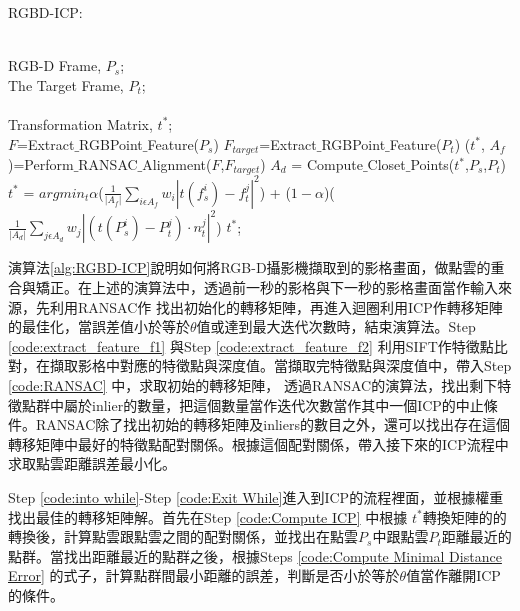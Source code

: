 \begin{algorithm}[htb] 
\renewcommand{\algorithmicrequire}{\textbf{Input:}}
\renewcommand\algorithmicensure {\textbf{Output:} }
\caption{ RGBD-ICP: } %
	\label{alg:RGBD-ICP} %
	\begin{algorithmic}[1] %
	\REQUIRE ~~\\ %
	RGB-D Frame, $P_s$;\\
	The Target Frame, $P_t$;\\
	\ENSURE ~~\\ %
	Transformation Matrix, $t^*$;\\

	\STATE $F$=Extract$\_$RGBPoint$\_$Feature($P_s$) \label{code:extract_feature_f1} 
	\STATE $F_{target}$=Extract$\_$RGBPoint$\_$Feature($P_t$) \label{code:extract_feature_f2}
	\STATE ($t^*$, $A_f$)=Perform$\_$RANSAC$\_$Alignment($F$,$F_{target}$) \label{code:RANSAC}
	\REPEAT \label{code:into while}
		\STATE $A_d$ = Compute$\_$Closet$\_$Points($t^*$,$P_s$,$P_t$) \label{code:Compute ICP}
		\STATE $t^*$ = $argmin_t \alpha$($\frac{1}{|A_f|}\sum_{i \epsilon A_f} w_i|t(f_s^i)-f_t^j|^2$) + ($1-\alpha$)($\frac{1}{|A_d|}\sum_{j \epsilon A_d} w_j|(t(P_s^i)-P_t^j)\cdot n_t^j|^2$) \label{code:Compute Minimal Distance Error}
	 \label{code:Exit While}
	\RETURN $t^*$; %
\end{algorithmic}
\end{algorithm}

	演算法\ref{alg:RGBD-ICP}說明如何將RGB-D攝影機擷取到的影格畫面，做點雲的重合與矯正。在上述的演算法中，透過前一秒的影格與下一秒的影格畫面當作輸入來源，先利用RANSAC作
找出初始化的轉移矩陣，再進入迴圈利用ICP作轉移矩陣的最佳化，當誤差值小於等於$\theta$值或達到最大迭代次數時，結束演算法。Step \ref{code:extract_feature_f1} 與Step \ref{code:extract_feature_f2} 利用SIFT作特徵點比對，在擷取影格中對應的特徵點與深度值。當擷取完特徵點與深度值中，帶入Step \ref{code:RANSAC} 中，求取初始的轉移矩陣，
透過RANSAC的演算法，找出剩下特徵點群中屬於inlier的數量，把這個數量當作迭代次數當作其中一個ICP的中止條件。RANSAC除了找出初始的轉移矩陣及inliers的數目之外，還可以找出存在這個
轉移矩陣中最好的特徵點配對關係。根據這個配對關係，帶入接下來的ICP流程中求取點雲距離誤差最小化。
	
	Step \ref{code:into while}-Step \ref{code:Exit While}進入到ICP的流程裡面，並根據權重找出最佳的轉移矩陣解。首先在Step \ref{code:Compute ICP} 中根據
$t^*$轉換矩陣的的轉換後，計算點雲跟點雲之間的配對關係，並找出在點雲$P_s$中跟點雲$P_t$距離最近的點群。當找出距離最近的點群之後，根據Steps \ref{code:Compute Minimal Distance
Error} 的式子，計算點群間最小距離的誤差，判斷是否小於等於$\theta$值當作離開ICP的條件。

